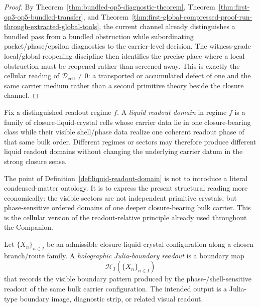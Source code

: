 \begin{proof}
By Theorem~\ref{thm:bundled-op5-diagnostic-theorem}, Theorem~\ref{thm:first-op3-op5-bundled-transfer}, and Theorem~\ref{thm:first-global-compressed-proof-run-through-extracted-global-tools}, the current channel already distinguishes a bundled pass from a bundled obstruction while subordinating packet/phase/epsilon diagnostics to the carrier-level decision. The witness-grade local/global reopening discipline then identifies the precise place where a local obstruction must be reopened rather than screened away. This is exactly the cellular reading of $\mathcal D_{\mathrm{cell}}\neq 0$: a transported or accumulated defect of one and the same carrier medium rather than a second primitive theory beside the closure channel.
\end{proof}

\begin{definition}
\label{def:liquid-readout-domain}
Fix a distinguished readout regime $f$. A \emph{liquid readout domain} in regime $f$ is a family of closure-liquid-crystal cells whose carrier data lie in one closure-bearing class while their visible shell/phase data realize one coherent readout phase of that same bulk order. Different regimes or sectors may therefore produce different liquid readout domains without changing the underlying carrier datum in the strong closure sense.
\end{definition}

\begin{remark}
\label{rem:readouts-as-liquid-crystal-domains}
The point of Definition~\ref{def:liquid-readout-domain} is not to introduce a literal condensed-matter ontology. It is to express the present structural reading more economically: the visible sectors are not independent primitive crystals, but phase-sensitive ordered domains of one deeper closure-bearing bulk carrier. This is the cellular version of the readout-relative principle already used throughout the Companion.
\end{remark}

\begin{definition}
\label{def:holographic-julia-boundary-readout}
Let $\{X_n\}_{n\in I}$ be an admissible closure-liquid-crystal configuration along a chosen branch/route family. A \emph{holographic Julia-boundary readout} is a boundary map
\[
 \mathcal H_{\mathrm{J}}(\{X_n\}_{n\in I})
\]
that records the visible boundary pattern produced by the phase-/shell-sensitive readout of the same bulk carrier configuration. The intended output is a Julia-type boundary image, diagnostic strip, or related visual readout.
\end{definition}

